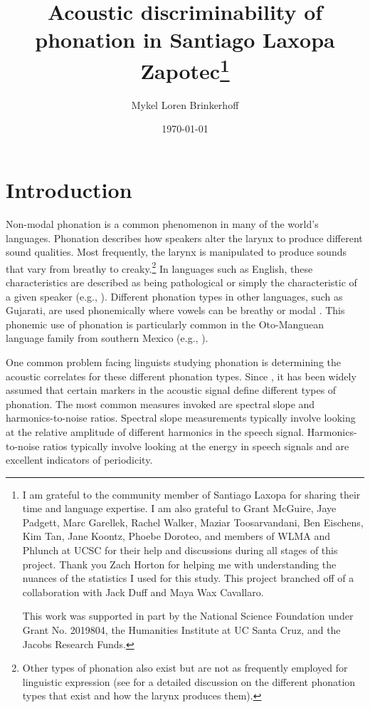\documentclass[12pt, letterpaper]{article}
\title{Acoustic discriminability of phonation in Santiago Laxopa Zapotec\thanks{I am grateful to the community member of Santiago Laxopa for sharing their time and language expertise. I am also grateful to Grant McGuire, Jaye Padgett, Marc Garellek, Rachel Walker, Maziar Toosarvandani, Ben Eischens, Kim Tan, Jane Koontz, Phoebe Doroteo, and members of WLMA and Phlunch at UCSC for their help and discussions during all stages of this project. Thank you Zach Horton for helping me with understanding the nuances of the statistics I used for this study. This project branched off of a collaboration with Jack Duff and Maya Wax Cavallaro.

This work was supported in part by the National Science Foundation under Grant No. 2019804, the Humanities Institute at UC Santa Cruz, and the Jacobs Research Funds.}}
\author{Mykel Loren Brinkerhoff}
\date{\today}
\begin{document}
	

    \onehalfspacing

\maketitle

\tableofcontents

\section{Introduction} \label{sec:Introduction}
Non-modal phonation is a common phenomenon in many of the world's languages. Phonation describes how speakers alter the larynx to produce different sound qualities. Most frequently, the larynx is manipulated to produce sounds that vary from breathy to creaky.\footnote{Other types of phonation also exist but are not as frequently employed for linguistic expression (see \cite{eslingVoiceQualityLaryngeal2019} for a detailed discussion on the different phonation types that exist and how the larynx produces them).} In languages such as English, these characteristics are described as being pathological or simply the characteristic of a given speaker (e.g., \cite{klattAnalysisSynthesisPerception1990}). Different phonation types in other languages, such as Gujarati, are used phonemically where vowels can be breathy or modal \citep{fischer-jorgensenPhoneticAnalysisBreathy1968}. This phonemic use of phonation is particularly common in the Oto-Manguean language family from southern Mexico (e.g., \cite{suarezMesoamericanIndianLanguages1983,campbellMesoAmericaLinguisticArea1986,silvermanLaryngealComplexityOtomanguean1997,campbellOtomangueanHistoricalLinguistics2017a,campbellOtomangueanHistoricalLinguistics2017}).

One common problem facing linguists studying phonation is determining the acoustic correlates for these different phonation types. Since \citet{fischer-jorgensenPhoneticAnalysisBreathy1968}, it has been widely assumed that certain markers in the acoustic signal define different types of phonation. The most common measures invoked are spectral slope and harmonics-to-noise ratios. Spectral slope measurements typically involve looking at the relative amplitude of different harmonics in the speech signal. Harmonics-to-noise ratios typically involve looking at the energy in speech signals and are excellent indicators of periodicity. 
\end{document}
